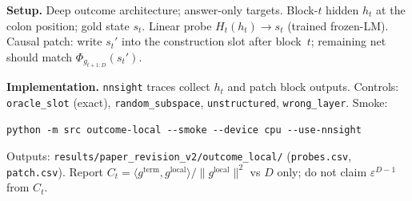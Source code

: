 
\textbf{Setup.} Deep outcome architecture; answer-only targets. Block-$t$ hidden
$h_t$ at the colon position; gold state $s_t$. Linear probe $H_t(h_t)\to s_t$
(trained frozen-LM). Causal patch: write $s_t'$ into the construction slot after
block~$t$; remaining net should match $\Phi_{g_{t+1:D}}(s_t')$.

\textbf{Implementation.} \texttt{nnsight} traces collect $h_t$ and patch block
outputs. Controls: \texttt{oracle\_slot} (exact), \texttt{random\_subspace},
\texttt{unstructured}, \texttt{wrong\_layer}. Smoke:
\begin{verbatim}
python -m src outcome-local --smoke --device cpu --use-nnsight
\end{verbatim}
Outputs: \texttt{results/paper\_revision\_v2/outcome\_local/} (\texttt{probes.csv},
\texttt{patch.csv}). Report $C_t=\langle g^{\mathrm{term}},g^{\mathrm{local}}\rangle/
\|g^{\mathrm{local}}\|^2$ vs $D$ only; do not claim $\varepsilon^{D-1}$ from $C_t$.
